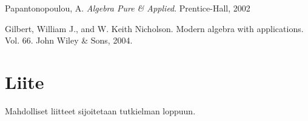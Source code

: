 \documentclass[a4paper,12pt,leqno,oneside]{report} %
\theoremstyle{plain}
\theoremstyle{definition}
\theoremstyle{remark}
\numberwithin{equation}{chapter}
\begin{document}



\begin{thebibliography}{9}


    Papantonopoulou, A. \emph{Algebra Pure \& Applied}.
    Prentice-Hall, 2002

    Gilbert, William J., and W. Keith Nicholson. Modern algebra with applications. Vol. 66. John Wiley & Sons, 2004.

\end{thebibliography}


\chapter*{Liite}

Mahdolliset liitteet sijoitetaan tutkielman loppuun.

%


   
\end{document}
